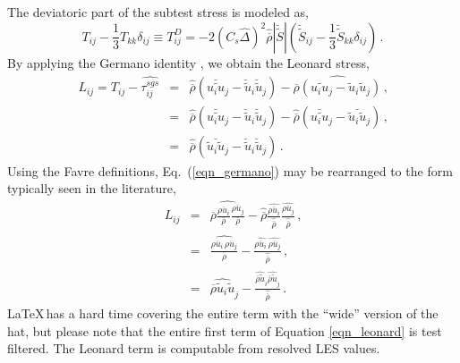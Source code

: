 The deviatoric part of the subtest stress is modeled as,
\begin{equation}
\label{eqn_devtest}
T_{ij} - \frac{1}{3}T_{kk}\delta_{ij} \equiv T_{ij}^D = -2 \left( C_s \widehat{\Delta} \right)^2 \widehat{\overline{\rho}} |\breve{\widetilde{S}}|\left(\breve{\widetilde{S}}_{ij} - \frac{1}{3} \breve{\widetilde{S}}_{kk}\delta_{ij}\right)  \,\mbox{.}
\end{equation}
By applying the Germano identity \cite{Germano:1991}, we obtain the Leonard stress,
\begin{eqnarray}
L_{ij} = T_{ij} - \widehat{\tau_{ij}^{sgs}} &=& \widehat{\overline{\rho}} \left( \breve{\widetilde{u_i u_j}} - \breve{\widetilde{u}}_i \breve{\widetilde{u}}_j \right) - \widehat{ \overline{\rho} \left( \widetilde{u_i u_j} - \widetilde{u}_i \widetilde{u}_j \right)} \,\mbox{,} \nonumber\\
&=&  \widehat{\overline{\rho}} \left( \breve{\widetilde{u_i u_j}} - \breve{\widetilde{u}}_i \breve{\widetilde{u}}_j \right) - \widehat{\overline{\rho}} \left( \breve{\widetilde{u_i u_j}} - \breve{\widetilde{u}_i \widetilde{u}_j} \right) \,\mbox{,} \nonumber \\
\label{eqn_germano} &=&  \widehat{\overline{\rho}} \left( \breve{\widetilde{u}_i \widetilde{u}_j} - \breve{\widetilde{u}}_i \breve{\widetilde{u}}_j \right) \,\mbox{.}
\end{eqnarray}
Using the Favre definitions, Eq.~(\ref{eqn_germano}) may be rearranged to the form typically seen in the literature,
\begin{eqnarray}
L_{ij} &=&  \widehat{\overline{\rho} \frac{\overline{\rho u_i}}{\overline{\rho}} \frac{\overline{\rho u_j}}{\overline{\rho}}} - \widehat{\overline{\rho}} \frac{ \widehat{\overline{\rho u_i}}}{\widehat{\overline{\rho}}} \frac{\widehat{\overline{\rho u_j}}}{\widehat{\overline{\rho}}} \,\mbox{,} \nonumber \\
&=& \widehat{\frac{\overline{\rho u_i}\, \overline{\rho u_j}}{\overline{\rho}}} - \frac{ \widehat{\overline{\rho u_i}} \,\widehat{\overline{\rho u_j}}}{\widehat{\overline{\rho}}} \,\mbox{,} \nonumber \\
\label{eqn_leonard} &=& \widehat{\overline{\rho} \widetilde{u}_i \widetilde{u}}_j - \frac{ \widehat{\overline{\rho} \widetilde{u}}_i \widehat{\overline{\rho} \widetilde{u}}_j }{ \widehat{\overline{\rho}} } \,\mbox{.}
\end{eqnarray}
\LaTeX\,has a hard time covering the entire term with the ``wide'' version of the hat, but please note that the entire first term of Equation \ref{eqn_leonard} is test filtered. The Leonard term is computable from resolved LES values.

